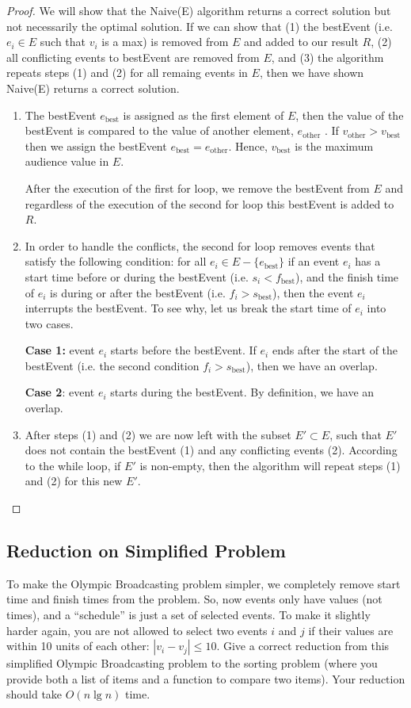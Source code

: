 \documentclass[11pt, oneside]{article}   	%
\theoremstyle{definition}
\theoremstyle{remark}
\begin{document}
\begin{proof}
	We will show that the Naive(E) algorithm returns a correct solution but not necessarily the optimal solution. If we can show that (1) the bestEvent (i.e. $e_i\in E$ such that $v_i$ is a max) is removed from $E$ and added to our result $R$, (2) all conflicting events to bestEvent are removed from $E$, and (3) the algorithm repeats steps (1) and (2) for all remaing events in $E$, then we have shown Naive(E) returns a correct solution. 
	\begin{enumerate}
		\item The bestEvent $e_\text{best}$ is assigned as the first element of $E$, then the value of the bestEvent is compared to the value of another element, $e_\text{other}$ . If $v_\text{other} > v_\text{best}$ then we assign the bestEvent $e_\text{best} = e_\text{other}$. Hence, $v_\text{best}$ is the maximum audience value in $E$.
		
		After the execution of the first for loop, we remove the bestEvent from $E$ and regardless of the execution of the second for loop this bestEvent is added to $R$.
		
		\item In order to handle the conflicts, the second for loop removes events that satisfy the following condition: for all $ e_i \in E - \{e_\text{best}\}$ if an event $e_i$ has a start time before or during the bestEvent (i.e. $s_i < f_\text{best}$), and the finish time of $e_i$ is during or after the bestEvent (i.e. $f_i > s_\text{best}$), then the event $e_i$ interrupts the bestEvent. To see why, let us break the start time of $e_i$ into two cases.
		
			\textbf{Case 1:} event $e_i$ starts before the bestEvent. If $e_i$ ends after the start of the bestEvent (i.e. the second condition $f_i > s_\text{best}$), then we have an overlap.
		
			\textbf{Case 2}: event $e_i$ starts during the bestEvent. By definition, we have an overlap.
		
		\item After steps (1) and (2) we are now left with the subset $E' \subset E$, such that $E'$ does not contain the bestEvent (1) and any conflicting events (2). According to the while loop, if $E'$ is non-empty, then the algorithm will repeat steps (1) and (2) for this new $E'$.
	\end{enumerate}
\end{proof}

\subsection{Reduction on Simplified Problem}
To make the Olympic Broadcasting problem simpler, we completely remove
start time and finish times from the problem. So, now events only have
values (not times), and a ``schedule'' is just a set of selected
events. To make it slightly harder again, you are not allowed to
select two events $i$ and $j$ if their values are within 10 units of
each other: $|v_i - v_j| \leq 10$.
Give a correct reduction from this simplified Olympic Broadcasting
problem to the sorting problem (where you provide both a list of items
and a function to compare two items). Your reduction should take $O(n
\lg n)$ time.
\end{document}
